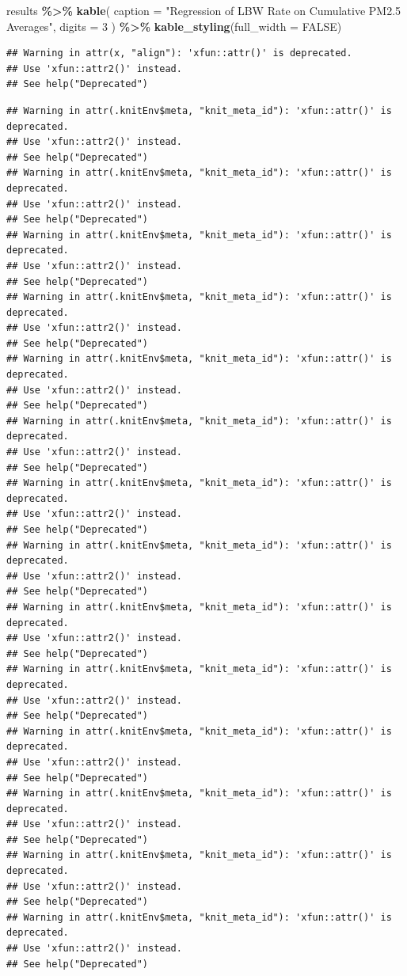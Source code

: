 \documentclass[
]{article}
\newenvironment{Shaded}{\begin{snugshade}}{\end{snugshade}}
\newcommand{\AttributeTok}[1]{\textcolor[rgb]{0.13,0.29,0.53}{#1}}
\newcommand{\ConstantTok}[1]{\textcolor[rgb]{0.56,0.35,0.01}{#1}}
\newcommand{\DecValTok}[1]{\textcolor[rgb]{0.00,0.00,0.81}{#1}}
\newcommand{\FunctionTok}[1]{\textcolor[rgb]{0.13,0.29,0.53}{\textbf{#1}}}
\newcommand{\NormalTok}[1]{#1}
\newcommand{\SpecialCharTok}[1]{\textcolor[rgb]{0.81,0.36,0.00}{\textbf{#1}}}
\newcommand{\StringTok}[1]{\textcolor[rgb]{0.31,0.60,0.02}{#1}}
\begin{document}
\begin{Shaded}
\begin{Highlighting}[]
\NormalTok{results }\SpecialCharTok{\%\textgreater{}\%}
  \FunctionTok{kable}\NormalTok{(}
    \AttributeTok{caption =} \StringTok{"Regression of LBW Rate on Cumulative PM2.5 Averages"}\NormalTok{,}
    \AttributeTok{digits  =} \DecValTok{3}
\NormalTok{  ) }\SpecialCharTok{\%\textgreater{}\%}
  \FunctionTok{kable\_styling}\NormalTok{(}\AttributeTok{full\_width =} \ConstantTok{FALSE}\NormalTok{)}
\end{Highlighting}
\end{Shaded}

\begin{verbatim}
## Warning in attr(x, "align"): 'xfun::attr()' is deprecated.
## Use 'xfun::attr2()' instead.
## See help("Deprecated")
\end{verbatim}

\begin{verbatim}
## Warning in attr(.knitEnv$meta, "knit_meta_id"): 'xfun::attr()' is deprecated.
## Use 'xfun::attr2()' instead.
## See help("Deprecated")
## Warning in attr(.knitEnv$meta, "knit_meta_id"): 'xfun::attr()' is deprecated.
## Use 'xfun::attr2()' instead.
## See help("Deprecated")
## Warning in attr(.knitEnv$meta, "knit_meta_id"): 'xfun::attr()' is deprecated.
## Use 'xfun::attr2()' instead.
## See help("Deprecated")
## Warning in attr(.knitEnv$meta, "knit_meta_id"): 'xfun::attr()' is deprecated.
## Use 'xfun::attr2()' instead.
## See help("Deprecated")
## Warning in attr(.knitEnv$meta, "knit_meta_id"): 'xfun::attr()' is deprecated.
## Use 'xfun::attr2()' instead.
## See help("Deprecated")
## Warning in attr(.knitEnv$meta, "knit_meta_id"): 'xfun::attr()' is deprecated.
## Use 'xfun::attr2()' instead.
## See help("Deprecated")
## Warning in attr(.knitEnv$meta, "knit_meta_id"): 'xfun::attr()' is deprecated.
## Use 'xfun::attr2()' instead.
## See help("Deprecated")
## Warning in attr(.knitEnv$meta, "knit_meta_id"): 'xfun::attr()' is deprecated.
## Use 'xfun::attr2()' instead.
## See help("Deprecated")
## Warning in attr(.knitEnv$meta, "knit_meta_id"): 'xfun::attr()' is deprecated.
## Use 'xfun::attr2()' instead.
## See help("Deprecated")
## Warning in attr(.knitEnv$meta, "knit_meta_id"): 'xfun::attr()' is deprecated.
## Use 'xfun::attr2()' instead.
## See help("Deprecated")
## Warning in attr(.knitEnv$meta, "knit_meta_id"): 'xfun::attr()' is deprecated.
## Use 'xfun::attr2()' instead.
## See help("Deprecated")
## Warning in attr(.knitEnv$meta, "knit_meta_id"): 'xfun::attr()' is deprecated.
## Use 'xfun::attr2()' instead.
## See help("Deprecated")
## Warning in attr(.knitEnv$meta, "knit_meta_id"): 'xfun::attr()' is deprecated.
## Use 'xfun::attr2()' instead.
## See help("Deprecated")
## Warning in attr(.knitEnv$meta, "knit_meta_id"): 'xfun::attr()' is deprecated.
## Use 'xfun::attr2()' instead.
## See help("Deprecated")
\end{verbatim}
\end{document}
